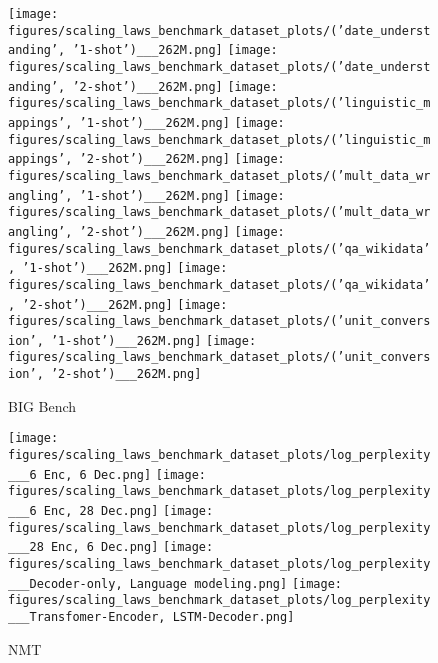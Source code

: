 \begin{figure*}
    \centering

\texttt{[image: figures/scaling\_laws\_benchmark\_dataset\_plots/('date\_understanding', '1-shot')\_\_\_262M.png]}
\texttt{[image: figures/scaling\_laws\_benchmark\_dataset\_plots/('date\_understanding', '2-shot')\_\_\_262M.png]}
\texttt{[image: figures/scaling\_laws\_benchmark\_dataset\_plots/('linguistic\_mappings', '1-shot')\_\_\_262M.png]}
\texttt{[image: figures/scaling\_laws\_benchmark\_dataset\_plots/('linguistic\_mappings', '2-shot')\_\_\_262M.png]}
\texttt{[image: figures/scaling\_laws\_benchmark\_dataset\_plots/('mult\_data\_wrangling', '1-shot')\_\_\_262M.png]}
\texttt{[image: figures/scaling\_laws\_benchmark\_dataset\_plots/('mult\_data\_wrangling', '2-shot')\_\_\_262M.png]}
\texttt{[image: figures/scaling\_laws\_benchmark\_dataset\_plots/('qa\_wikidata', '1-shot')\_\_\_262M.png]}
\texttt{[image: figures/scaling\_laws\_benchmark\_dataset\_plots/('qa\_wikidata', '2-shot')\_\_\_262M.png]}
\texttt{[image: figures/scaling\_laws\_benchmark\_dataset\_plots/('unit\_conversion', '1-shot')\_\_\_262M.png]}
\texttt{[image: figures/scaling\_laws\_benchmark\_dataset\_plots/('unit\_conversion', '2-shot')\_\_\_262M.png]}

    \caption{
    BIG Bench
    }
    \label{fig:scaling_laws_benchmark_dataset__big_bench}
\end{figure*}

\begin{figure*}
    \centering

\texttt{[image: figures/scaling\_laws\_benchmark\_dataset\_plots/log\_perplexity\_\_\_6 Enc, 6 Dec.png]}
\texttt{[image: figures/scaling\_laws\_benchmark\_dataset\_plots/log\_perplexity\_\_\_6 Enc, 28 Dec.png]}
\texttt{[image: figures/scaling\_laws\_benchmark\_dataset\_plots/log\_perplexity\_\_\_28 Enc, 6 Dec.png]}
\texttt{[image: figures/scaling\_laws\_benchmark\_dataset\_plots/log\_perplexity\_\_\_Decoder-only, Language modeling.png]}
\texttt{[image: figures/scaling\_laws\_benchmark\_dataset\_plots/log\_perplexity\_\_\_Transfomer-Encoder, LSTM-Decoder.png]}

    \caption{
    NMT
    }
    \label{fig:scaling_laws_benchmark_dataset__nmt}
\end{figure*}

